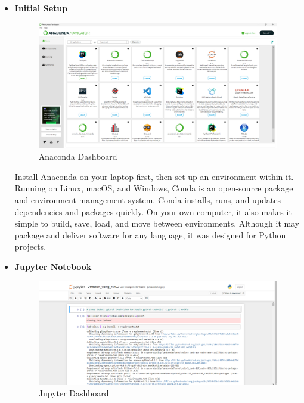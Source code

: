\documentclass[12pt,a4paper]{report}
\begin{document}
\begin{itemize}
    \item {\bf{Initial Setup}}
    \begin{figure}[!htb]
\begin{center}
\includegraphics[scale=0.3]{images/platform_SS/Screenshot (6).png}
\caption{Anaconda Dashboard}
\end{center}
\end{figure}

\par Install Anaconda on your laptop first, then set up an environment within it. Running on Linux, macOS, and Windows, Conda is an open-source package and environment management system. Conda installs, runs, and updates dependencies and packages quickly. On your own computer, it also makes it simple to build, save, load, and move between environments. Although it may package and deliver software for any language, it was designed for Python projects.



\item {\bf{Jupyter Notebook }}

\begin{figure}[!htb]
\begin{center}
\includegraphics[scale=0.3]{images/platform_SS/Screenshot (3).png}
\caption{Jupyter Dashboard}
\end{center}
\end{figure}



\end{itemize}
\end{document}
